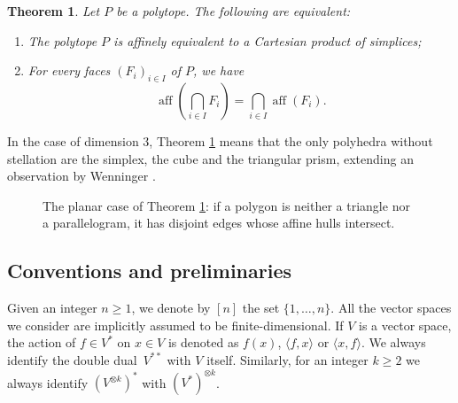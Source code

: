 \documentclass{amsart}
\renewcommand{\geq}{\geqslant}
\DeclareMathOperator{\aff}{\mathrm{aff}}
\theoremstyle{plain}
\newtheorem{theorem}{Theorem}
\begin{document}
\begin{theorem} \label{theorem:polysimplices}
Let $P$ be a polytope. The following are equivalent:
\begin{enumerate}
    \item[(i)] The polytope $P$ is affinely equivalent to a Cartesian product of simplices;
    \item[(ii)] For every faces $(F_i)_{i \in I}$ of $P$, we have
    \begin{equation} \label{eq:aff} %
    \aff \left( \bigcap_{i \in I} F_i \right) = \bigcap_{i \in I} \aff ( F_i). \end{equation}
\end{enumerate}
\end{theorem}

In the case of dimension $3$, Theorem \ref{theorem:polysimplices} means that the only polyhedra without stellation are the simplex, the cube and the triangular prism, extending an observation by Wenninger \cite[p.35]{Wenninger74}.

\begin{figure}[htbp] \begin{center}
\end{center} 
\caption{The planar case of Theorem \ref{theorem:polysimplices}: if a polygon is neither a triangle nor a parallelogram, it has disjoint edges whose affine hulls intersect.}
\label{figure-th3}
\end{figure}

\subsection*{Conventions and preliminaries} Given an integer $n \geq 1$, we denote by $[n]$ the set $\{1,\dots,n\}$. All the vector spaces we consider are implicitly assumed to be finite-dimensional. If $V$ is a vector space, the action of $f \in V^*$ on $x \in V$ is denoted as $f(x)$, $\langle f,x \rangle$ or $\langle x,f \rangle$. We always identify the double dual~$V^{**}$ with $V$ itself. Similarly, for an integer $k \geq 2$ we always identify $(V^{\otimes k})^*$ with $(V^*)^{\otimes k}$.
\end{document}
